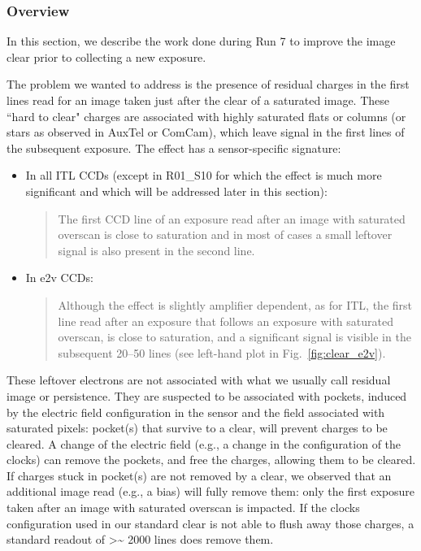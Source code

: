 \subsubsection{Overview}\label{overview}

In this section, we describe the work done during Run 7 to improve
the image clear prior to collecting a new exposure.

The problem we wanted to address is the presence of residual charges in
the first lines read for an image taken just after the clear of a saturated
image. These ``hard to clear" charges are associated with highly
saturated flats or columns (or stars as observed in AuxTel or ComCam),
which leave signal in the first lines of the subsequent exposure. The effect has a sensor-specific signature:

\begin{itemize}
\item
  In all ITL CCDs (except in R01\_S10 for which
  the effect is much more significant and which will be addressed later
  in this section):

  \begin{quote}
  The first CCD line of an exposure read after an image with saturated
  overscan is close to saturation and in most of cases a small leftover signal is also present in the second line.
  \end{quote}
\item
  In e2v CCDs:

  \begin{quote}
  Although the effect is slightly amplifier dependent, as for ITL, the
  first line read after an exposure that follows an exposure with saturated
  overscan, is close to saturation, and a significant signal is visible
  in the subsequent 20--50 lines (see left-hand plot in Fig.~\ref{fig:clear_e2v}).
  \end{quote}
\end{itemize}

These leftover electrons are not associated with what we usually call 
residual image or persistence. They are suspected to be associated with
pockets, induced by the electric field configuration in the sensor and
the field associated with saturated pixels: pocket(s) that survive to a
clear, will prevent charges to be cleared. A change of the electric
field (e.g., a change in the configuration of the clocks) can remove the pockets, and
free the charges, allowing them to be cleared. If charges stuck in
pocket(s) are not removed by a clear, we observed that an additional image read
(e.g., a bias) will fully remove them: only the first exposure taken after
an image with saturated overscan is impacted. If the clocks
configuration used in our standard clear is not able to flush away those
charges, a standard readout of \textgreater\textasciitilde{} 2000 lines
does remove them.

